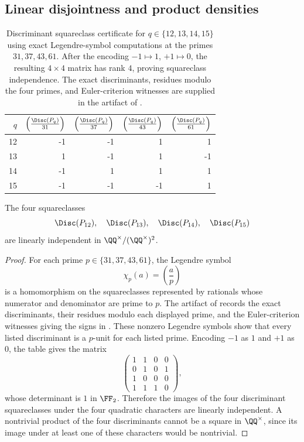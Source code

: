 ﻿\subsection{Linear disjointness and product densities}

\begin{table}[t]
\centering
\scriptsize
\setlength{\tabcolsep}{6pt}
\caption{Discriminant squareclass certificate for \(q\in\{12,13,14,15\}\)
using exact Legendre-symbol computations at the primes \(31,37,43,61\).  After
the encoding \(-1\mapsto 1\), \(+1\mapsto 0\), the resulting \(4\times 4\)
matrix has rank \(4\), proving squareclass independence.  The exact
discriminants, residues modulo the four primes, and Euler-criterion witnesses
are supplied in the artifact of
.}
\label{tab:disc-squareclass-q12-15}
\begin{tabular}{r r r r r}
\toprule
\(q\) & \(\left(\frac{\Disc(P_q)}{31}\right)\) &
\(\left(\frac{\Disc(P_q)}{37}\right)\) &
\(\left(\frac{\Disc(P_q)}{43}\right)\) &
\(\left(\frac{\Disc(P_q)}{61}\right)\) \\
\midrule
12 & -1 & -1 & 1 & 1 \\
13 & 1 & -1 & 1 & -1 \\
14 & -1 & 1 & 1 & 1 \\
15 & -1 & -1 & -1 & 1 \\
\bottomrule
\end{tabular}
\end{table}

\begin{lemma}
\label{lem:discriminant-squareclass-certificate}
The four squareclasses
\[
  \Disc(P_{12}),\quad \Disc(P_{13}),\quad
  \Disc(P_{14}),\quad \Disc(P_{15})
\]
are linearly independent in \(\QQ^\times/(\QQ^\times)^2\).
\end{lemma}

\begin{proof}
For each prime \(p\in\{31,37,43,61\}\), the Legendre symbol
\[
  \chi_p(a)=\left(\frac{a}{p}\right)
\]
is a homomorphism on the squareclasses represented by rationals whose numerator
and denominator are prime to \(p\).  The artifact of
 records the exact
discriminants, their residues modulo each displayed prime, and the
Euler-criterion witnesses giving the signs in
.  These nonzero Legendre symbols show that
every listed discriminant is a \(p\)-unit for each listed prime.  Encoding
\(-1\) as \(1\) and \(+1\) as \(0\), the table gives the matrix
\[
  \begin{pmatrix}
  1&1&0&0\\
  0&1&0&1\\
  1&0&0&0\\
  1&1&1&0
  \end{pmatrix},
\]
whose determinant is \(1\) in \(\FF_2\).  Therefore the images of the four
discriminant squareclasses under the four quadratic characters are linearly
independent.  A nontrivial product of the four discriminants cannot be a square
in \(\QQ^\times\), since its image under at least one of these characters would
be nontrivial.
\end{proof}

